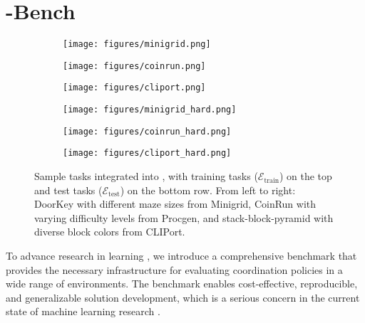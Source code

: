 \section{\ourMethod-Bench}


\begin{figure}[tbp]
\centering
    \begin{subfigure}{}
        \centering
        \texttt{[image: figures/minigrid.png]}
    \end{subfigure}
    \begin{subfigure}{}
        \centering
        \texttt{[image: figures/coinrun.png]}
    \end{subfigure}
    \begin{subfigure}{}
        \centering
        \texttt{[image: figures/cliport.png]}
    \end{subfigure}
    \begin{subfigure}{}
        \centering
        \texttt{[image: figures/minigrid\_hard.png]}
    \end{subfigure}
    \begin{subfigure}{}
        \centering
        \texttt{[image: figures/coinrun\_hard.png]}
    \end{subfigure}
    \begin{subfigure}{}
        \centering
        \texttt{[image: figures/cliport\_hard.png]}
    \end{subfigure}
    \caption{Sample tasks integrated into \ourMethod, with training tasks ($\mathcal{E}_{\text{train}}$) on the top and test tasks ($\mathcal{E}_{\text{test}}$) on the bottom row. From left to right: DoorKey with different maze sizes from Minigrid, CoinRun with varying difficulty levels from Procgen, and stack-block-pyramid with diverse block colors from CLIPort.}
    \label{fig:envs}
\end{figure}


To advance research in learning \ourMethod, we introduce a comprehensive benchmark that provides the necessary infrastructure for evaluating coordination policies in a wide range of environments. 
The benchmark enables cost-effective, reproducible, and generalizable solution development, which is a serious concern in the current state of machine learning research \citep{kapoor2022leakage}. 

